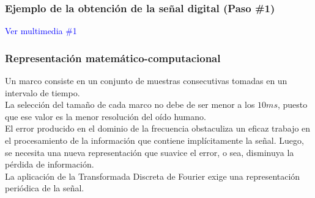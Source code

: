 \documentclass[
10pt, %
aspectratio=169, %
]{beamer}
\begin{document}
\begin{frame}
		
		
	\end{frame}
	
	\begin{frame}
		
		\frametitle{Ejemplo de la obtención de la señal digital (Paso \#1)}
		
		\textcolor{blue}{Ver multimedia \#1}	
		
		
	\end{frame}
	
	\begin{frame}
		
		\frametitle{Representación matemático-computacional}
		
		Un marco consiste en un conjunto de muestras consecutivas tomadas en un intervalo de tiempo.\\[4mm]
		
		La selección del tamaño de cada marco no debe de ser menor a los $10 ms$, puesto que ese valor es la menor resolución del oído humano. \\[4mm]
		
		El error producido en el dominio de la frecuencia obstaculiza un eficaz trabajo en el procesamiento de la información que contiene implícitamente la señal. Luego, se necesita una nueva representación que suavice el error, o sea, disminuya la pérdida de información. \\[4mm]

		La aplicación de la Transformada Discreta de Fourier exige una representación periódica de la señal. \\[4mm]
		
		
		
	\end{frame}
	
\end{document}
